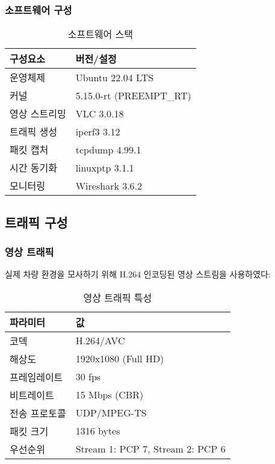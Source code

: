 \documentclass[twocolumn,10pt]{article}
\begin{document}
\subsubsection{소프트웨어 구성}

\begin{table}[h]
\centering
\caption{소프트웨어 스택}
\label{tab:software_stack}
\begin{tabular}{ll}
\toprule
\textbf{구성요소} & \textbf{버전/설정} \\
\midrule
운영체제 & Ubuntu 22.04 LTS \\
커널 & 5.15.0-rt (PREEMPT\_RT) \\
영상 스트리밍 & VLC 3.0.18 \\
트래픽 생성 & iperf3 3.12 \\
패킷 캡처 & tcpdump 4.99.1 \\
시간 동기화 & linuxptp 3.1.1 \\
모니터링 & Wireshark 3.6.2 \\
\bottomrule
\end{tabular}
\end{table}

\subsection{트래픽 구성}

\subsubsection{영상 트래픽}

실제 차량 환경을 모사하기 위해 H.264 인코딩된 영상 스트림을 사용하였다:

\begin{table}[h]
\centering
\caption{영상 트래픽 특성}
\label{tab:video_traffic}
\begin{tabular}{ll}
\toprule
\textbf{파라미터} & \textbf{값} \\
\midrule
코덱 & H.264/AVC \\
해상도 & 1920x1080 (Full HD) \\
프레임레이트 & 30 fps \\
비트레이트 & 15 Mbps (CBR) \\
전송 프로토콜 & UDP/MPEG-TS \\
패킷 크기 & 1316 bytes \\
우선순위 & Stream 1: PCP 7, Stream 2: PCP 6 \\
\bottomrule
\end{tabular}
\end{table}
\end{document}
